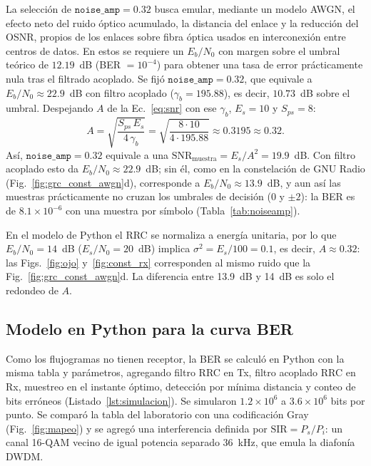 \documentclass[twocolumn]{IEEEtran}
\begin{document}
La selección de $\texttt{noise\_amp} = 0.32$ busca emular, mediante un modelo AWGN, el efecto neto del ruido óptico acumulado, la distancia del enlace y la reducción del OSNR, propios de los enlaces sobre fibra óptica usados en interconexión entre centros de datos. En estos se requiere un $E_b/N_0$ con margen sobre el umbral teórico de $12.19$~dB (BER $=10^{-4}$) para obtener una tasa de error prácticamente nula tras el filtrado acoplado. Se fijó $\texttt{noise\_amp}=0.32$, que equivale a $E_b/N_0\approx 22.9$~dB con filtro acoplado ($\gamma_b = 195.88$), es decir, $10.73$~dB sobre el umbral. Despejando $A$ de la Ec.~\eqref{eq:snr} con ese $\gamma_b$, $E_s = 10$ y $S_{ps} = 8$:
\begin{equation}
A = \sqrt{\frac{S_{ps}\,E_s}{4\,\gamma_b}}
  = \sqrt{\frac{8\cdot 10}{4\cdot 195.88}} \approx 0.3195 \approx 0.32 .
\end{equation}
Así, $\texttt{noise\_amp} = 0.32$ equivale a una $\mathrm{SNR}_{\text{muestra}} = E_s/A^2 = 19.9$~dB. Con filtro acoplado esto da $E_b/N_0 \approx 22.9$~dB; sin él, como en la constelación de GNU Radio (Fig.~\ref{fig:grc_const_awgn}d), corresponde a $E_b/N_0 \approx 13.9$~dB, y aun así las muestras prácticamente no cruzan los umbrales de decisión ($0$ y $\pm 2$): la BER es de $8.1\times10^{-6}$ con una muestra por símbolo (Tabla~\ref{tab:noiseamp}).

En el modelo de Python el RRC se normaliza a energía unitaria, por lo que $E_b/N_0=14$~dB ($E_s/N_0=20$~dB) implica $\sigma^2=E_s/100=0.1$, es decir, $A\approx0.32$: las Figs.~\ref{fig:ojo} y~\ref{fig:const_rx} corresponden al mismo ruido que la Fig.~\ref{fig:grc_const_awgn}d. La diferencia entre 13.9~dB y 14~dB es solo el redondeo de $A$.

\subsection{Modelo en Python para la curva BER}

Como los flujogramas no tienen receptor, la BER se calculó en Python \cite{harris2020numpy, virtanen2020scipy} con la misma tabla y parámetros, agregando filtro RRC en Tx, filtro acoplado RRC en Rx, muestreo en el instante óptimo, detección por mínima distancia y conteo de bits erróneos (Listado~\ref{lst:simulacion}). Se simularon $1.2\times10^6$ a $3.6\times10^6$ bits por punto. Se comparó la tabla del laboratorio con una codificación Gray (Fig.~\ref{fig:mapeo}) y se agregó una interferencia definida por $\text{SIR}=P_s/P_i$: un canal 16-QAM vecino de igual potencia separado 36~kHz, que emula la diafonía DWDM.
\end{document}

